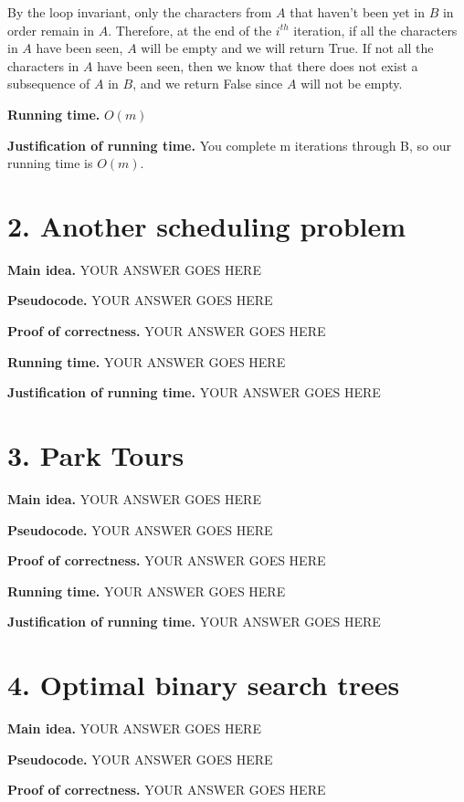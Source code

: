 \documentclass[11pt]{article}
\begin{document}
\noindent By the loop invariant, only the characters from $A$ that haven't been yet in $B$ in order remain in $A$.  Therefore, at the end of the $i^{th}$ iteration, if all the characters in $A$ have been seen, $A$ will be empty and we will return True.  If not all the characters in $A$ have been seen, then we know that there does not exist a subsequence of $A$ in $B$, and we return False since $A$ will not be empty.

\noindent
\textbf{Running time.}
$O(m)$


\noindent
\textbf{Justification of running time.}
You complete m iterations through B, so our running time is $O(m)$. 

\newpage
\section*{2. Another scheduling problem}
\noindent
\textbf{Main idea.}
YOUR ANSWER GOES HERE


\noindent
\textbf{Pseudocode.}
YOUR ANSWER GOES HERE

\noindent
\textbf{Proof of correctness.}
YOUR ANSWER GOES HERE


\noindent
\textbf{Running time.}
YOUR ANSWER GOES HERE


\noindent
\textbf{Justification of running time.}
YOUR ANSWER GOES HERE



\newpage
\section*{3. Park Tours}
\noindent
\textbf{Main idea.}
YOUR ANSWER GOES HERE


\noindent
\textbf{Pseudocode.}
YOUR ANSWER GOES HERE

\noindent
\textbf{Proof of correctness.}
YOUR ANSWER GOES HERE


\noindent
\textbf{Running time.}
YOUR ANSWER GOES HERE


\noindent
\textbf{Justification of running time.}
YOUR ANSWER GOES HERE


\newpage
\section*{4. Optimal binary search trees}
\noindent
\textbf{Main idea.}
YOUR ANSWER GOES HERE


\noindent
\textbf{Pseudocode.}
YOUR ANSWER GOES HERE

\noindent
\textbf{Proof of correctness.}
YOUR ANSWER GOES HERE
\end{document}

